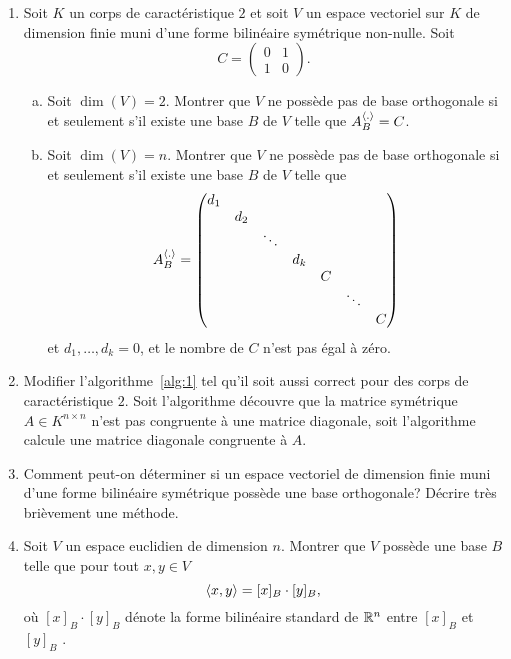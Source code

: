 \begin{enumerate}
\item Soit $K$ un corps de caractéristique $2$ et soit $V$ un espace vectoriel sur $K$ de dimension finie muni d'une forme bilinéaire symétrique non-nulle.  Soit 
  \begin{displaymath}
    C =
    \begin{pmatrix}
      0 & 1 \\
      1 & 0 
    \end{pmatrix}.
  \end{displaymath}
  \begin{enumerate}[a)]
  \item Soit $\dim(V) = 2$. Montrer que $V$ ne possède pas de base orthogonale si et seulement s'il existe une base $B$ de $V$ telle que $A_B^{\langle {.} \rangle} = C$. 
  \item Soit $\dim(V) = n$. Montrer que $V$ ne possède pas de base orthogonale si et seulement s'il existe une base $B$ de $V$ telle que 
    \begin{displaymath} A_B^{\langle {.} \rangle} = 
      \begin{pmatrix}
        d_1 \\
        & d_2 \\
        & & \ddots \\
        & &   & d_k \\
        & &   &  & C \\
        & &   &  & & \ddots \\
        & &   &  & & & C \\
      \end{pmatrix}
    \end{displaymath}
    et $d_1,\dots,d_k = 0$, et le nombre de $C$ n'est pas égal à zéro. 
  \end{enumerate}
\item Modifier l'algorithme~\ref{alg:1} tel qu'il soit aussi correct pour des corps de caractéristique $2$.  Soit l'algorithme découvre que la matrice symétrique $A \in K^{n \times n}$ n'est pas congruente à une matrice diagonale, soit l'algorithme calcule une matrice diagonale congruente à $A$. 
\item Comment peut-on déterminer si un espace vectoriel de dimension finie muni d'une forme bilinéaire symétrique  possède une base orthogonale? Décrire très brièvement une méthode. 
 
\item Soit $V$ un espace euclidien de dimension $n$. Montrer que $V$ possède une base $B$ telle que pour tout $x,y \in V$
  \begin{displaymath}
    \langle {x,y} \rangle = [x]_B \cdot [y]_B, 
  \end{displaymath}
où $ [x]_B \cdot [y]_B$  dénote la forme bilinéaire standard de $\mathbb{R}^n$ entre $[x]_B$ et $ [y]_B$ .  

\end{enumerate}




